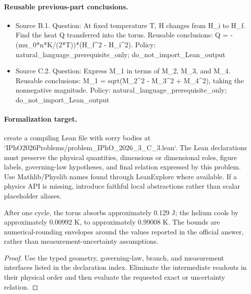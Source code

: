 \paragraph{Reusable previous-part conclusions.}
\begin{itemize}
\item Source B.1. Question: At fixed temperature T, H changes from H\_i to H\_f. Find the heat Q transferred into the torus. Reusable conclusions: Q = -(mu\_0*n*K/(2*T))*(H\_f\textasciicircum{}2 - H\_i\textasciicircum{}2). Policy: natural\_language\_prerequisite\_only; do\_not\_import\_Lean\_output
\item Source C.2. Question: Express M\_1 in terms of M\_2, M\_3, and M\_4. Reusable conclusions: M\_1 = sqrt(M\_2\textasciicircum{}2 - M\_3\textasciicircum{}2 + M\_4\textasciicircum{}2), taking the nonnegative magnitude. Policy: natural\_language\_prerequisite\_only; do\_not\_import\_Lean\_output
\end{itemize}

\paragraph{Formalization target.}
create a compiling Lean file with sorry bodies at `IPhO2026Problems/problem\_IPhO\_2026\_3\_C\_3.lean`. The Lean declarations must preserve the physical quantities, dimensions or dimensional roles, figure labels, governing-law hypotheses, and final relation expressed by this problem.
Use Mathlib/Physlib names found through LeanExplore where available. If a physics API is missing, introduce faithful local abstractions rather than scalar placeholder aliases.

\begin{theorem}
  \label{thm:physics:IPhO_2026_3_C_3:target}
  After one cycle, the torus absorbs approximately 0.129 J; the helium cools by approximately 0.00992 K, to approximately 0.99008 K. The bounds are numerical-rounding envelopes around the values reported in the official answer, rather than measurement-uncertainty assumptions.
\end{theorem}
\begin{proof}
  Use the typed geometry, governing-law, branch, and measurement interfaces listed in the declaration index.  Eliminate the intermediate readouts in their physical order and then evaluate the requested exact or uncertainty relation.
\end{proof}
